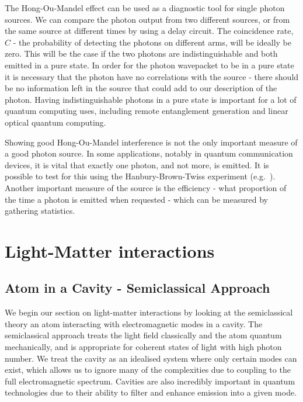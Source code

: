 The Hong-Ou-Mandel effect can be used as a diagnostic tool for single photon sources. We can compare the photon output from two different sources, or from the same source at different times by using a delay circuit. The coincidence rate, $C$ - the probability of detecting the photons on different arms, will be ideally be zero. This will be the case if the two photons are indistinguishable and both emitted in a pure state. In order for the photon wavepacket to be in a pure state it is necessary that the photon have no correlations with the source - there should be no information left in the source that could add to our description of the photon. Having indistinguishable photons in a pure state is important for a lot of quantum computing uses, including remote entanglement generation and linear optical quantum computing. 

Showing good Hong-Ou-Mandel interference is not the only important measure of a good photon source. In some applications, notably in quantum communication devices, it is vital that exactly one photon, and not more, is emitted. It is possible to test for this using the Hanbury-Brown-Twiss experiment (e.g.\ \cite{garrison+chiao}). Another important measure of the source is the efficiency - what proportion of the time a photon is emitted when requested - which can be measured by gathering statistics.


\section{Light-Matter interactions}

\subsection{Atom in a Cavity - Semiclassical Approach}\label{semiclassical_atom_cavity}

We begin our section on light-matter interactions by looking at the semiclassical theory an atom interacting with electromagnetic modes in a cavity. The semiclassical approach treats the light field classically and the atom quantum mechanically, and is appropriate for coherent states of light with high photon number. We treat the cavity as an idealised system where only certain modes can exist, which allows us to ignore many of the complexities due to coupling to the full electromagnetic spectrum. Cavities are also incredibly important in quantum technologies due to their ability to filter and enhance emission into a given mode.

